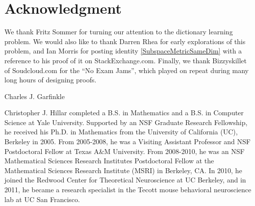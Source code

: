\documentclass[journal, onecolumn]{IEEEtran}
\begin{document}
\section*{Acknowledgment}
We thank Fritz Sommer for turning our attention to the dictionary learning problem. We would also like to thank Darren Rhea for early explorations of this problem, and Ian Morris for posting identity \eqref{SubspaceMetricSameDim} with a reference to his proof of it on StackExchange.com. Finally, we thank Bizzyskillet of Soudcloud.com for the ``No Exam Jams'', which played on repeat during many long hours of designing proofs.




\begin{IEEEbiographynophoto}{Charles J. Garfinkle}
\end{IEEEbiographynophoto}

\begin{IEEEbiographynophoto}{Christopher J. Hillar}
completed a B.S. in Mathematics and a B.S. in Computer Science at Yale University.  Supported by an NSF Graduate Research Fellowship, he received his Ph.D. in Mathematics from the University of California (UC), Berkeley in 2005. From 2005-2008, he was a Visiting Assistant Professor and NSF Postdoctoral Fellow at Texas A\&M University. From 2008-2010, he was an NSF Mathematical Sciences Research Institutes Postdoctoral Fellow at the Mathematical Sciences Research Institute (MSRI) in Berkeley, CA.  In 2010, he joined the Redwood Center for Theoretical Neuroscience at UC Berkeley, and in 2011, he  became a research specialist in the Tecott mouse behavioral neuroscience lab at UC San Francisco.
\end{IEEEbiographynophoto}
\end{document}
